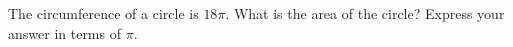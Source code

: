The circumference of a circle is $18\pi$. What is the area of the circle? Express your answer in terms of $\pi$.
